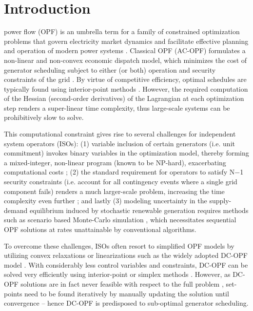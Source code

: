 \documentclass[journal]{IEEEtran}
\def\nmo{N$-$1}%
\begin{document}
\printnomenclature

\section{Introduction}
\label{sec:intro}

 power flow (OPF) is an umbrella term for a family of constrained optimization problems that govern electricity market dynamics and facilitate effective planning and operation of modern power systems \cite[p.~514]{Wood2014}. Classical OPF (AC-OPF) formulates a non-linear and non-convex economic dispatch model, which minimizes the cost of generator scheduling subject to either (or both) operation and security constraints of the grid \cite{Billinton1994}. By virtue of competitive efficiency, optimal schedules are typically found using interior-point methods \cite{Wachter2006}. However, the required computation of the Hessian (second-order derivatives) of the Lagrangian at each optimization step renders a super-linear time complexity, thus large-scale systems can be prohibitively slow to solve.

This computational constraint gives rise to several challenges for independent system operators (ISOs): (1) variable inclusion of certain generators (i.e. unit commitment) invokes binary variables in the optimization model, thereby forming a mixed-integer, non-linear program (known to be NP-hard), exacerbating computational costs \cite{Castillo2016}; (2) the standard requirement for operators to satisfy \nmo{} security constraints (i.e. account for all contingency events where a single grid component fails) renders a much larger-scale problem, increasing the time complexity even further \cite{Rahman2020}; and lastly (3) modeling uncertainty in the supply-demand equilibrium induced by stochastic renewable generation requires methods such as scenario based Monte-Carlo simulation \cite{Mezghani2020}, which necessitates sequential OPF solutions at rates unattainable by conventional algorithms. 

To overcome these challenges, ISOs often resort to simplified OPF models by utilizing convex relaxations \cite{Low2014} or linearizations \cite{Bolognani2015, Bernstein2017} such as the widely adopted DC-OPF model \cite{Cain2012}. With considerably less control variables and constraints, DC-OPF can be solved very efficiently using interior-point or simplex methods \cite[p.~224]{Vonmeier2006}.
However, as DC-OPF solutions are in fact never feasible with respect to the full problem \cite{Baker2020}, set-points need to be found iteratively by manually updating the solution until convergence \cite[p.~14]{FERC2011} -- hence DC-OPF is predisposed to sub-optimal generator scheduling.
\end{document}
